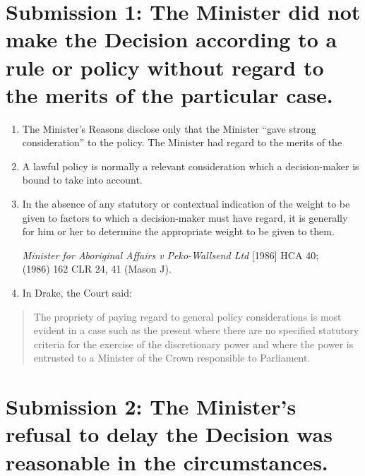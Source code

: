 \documentclass[12pt]{article}
\begin{document}
\section{Submission 1: The Minister did not make the Decision according
to a rule or policy without regard to the merits of the particular
case.}

\begin{enumerate}[1.]
\item
  The Minister's Reasons disclose only that the Minister ``gave strong
  consideration'' to the policy. The Minister had regard to the merits
  of the
\item
  A lawful policy is normally a relevant consideration which a
  decision-maker is bound to take into account.
\item
  In the absence of any statutory or contextual indication of the weight
  to be given to factors to which a decision-maker must have regard, it
  is generally for him or her to determine the appropriate weight to be
  given to them.

  \emph{Minister for Aboriginal Affairs v Peko-Wallsend Ltd} {[}1986{]}
  HCA 40; \\(1986) 162 CLR 24, 41 (Mason J).
\item
  In Drake, the Court said:
\end{enumerate}

\begin{quote}
The propriety of paying regard to general policy considerations is most
evident in a case such as the present where there are no speciﬁed
statutory criteria for the exercise of the discretionary power and where
the power is entrusted to a Minister of the Crown responsible to
Parliament.
\end{quote}

\section{Submission 2: The Minister's refusal to delay the Decision was
reasonable in the circumstances.}
\end{document}
